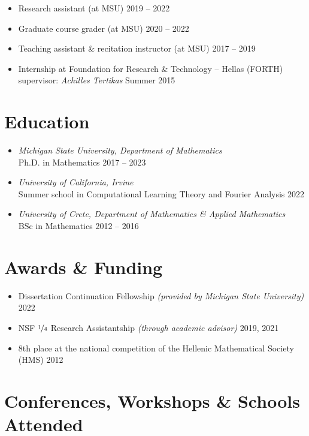 \documentclass[12pt]{article}
\begin{document}
\begin{itemize}
	\item Research assistant (at MSU) 							\hfill 2019 -- 2022
	\item Graduate course grader (at MSU)						\hfill  2020 -- 2022
	\item Teaching assistant \& recitation instructor (at MSU)	\hfill 2017 -- 2019
	\item Internship at Foundation for Research \& Technology -- Hellas (FORTH)\\
	supervisor: \emph{Achilles Tertikas}					\hfill Summer 2015
\end{itemize}


\section*{Education}

\begin{itemize}
	\item \emph{Michigan State University, Department of Mathematics}\\
	Ph.D. in Mathematics \hfill 2017 -- 2023
	\item \emph{University of California, Irvine}\\
	Summer school in Computational Learning Theory and Fourier Analysis \hfill 2022
	\item \emph{University of Crete, Department of Mathematics \& Applied Mathematics}\\
	BSc in Mathematics \hfill 2012 -- 2016
\end{itemize}


\section*{Awards \& Funding}

\begin{itemize}
	\item Dissertation Continuation Fellowship \textit{(provided by Michigan State University)}	\hfill 2022
	\item NSF $\nicefrac{1}{4}$ Research Assistantship \textit{(through academic advisor)}	\hfill	2019, 2021
	\item 8th place at the national competition of the Hellenic Mathematical Society (HMS)	\hfill	2012
\end{itemize}


\section*{Conferences, Workshops \& Schools Attended}
\end{document}
